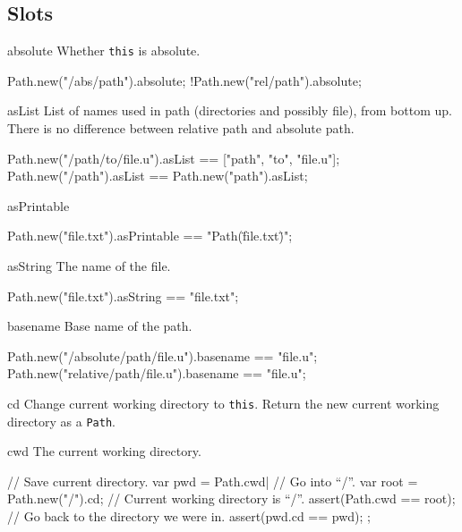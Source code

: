 \subsection{Slots}
\begin{urbiscriptapi}
\item[absolute]
  Whether \lstinline|this| is absolute.
\begin{urbiassert}
Path.new("/abs/path").absolute;
!Path.new("rel/path").absolute;
\end{urbiassert}

\item[asList]
  List of names used in path (directories and possibly file), from
  bottom up. There is no difference between relative path and absolute
  path.
\begin{urbiassert}
Path.new("/path/to/file.u").asList == ["path", "to", "file.u"];
Path.new("/path").asList           == Path.new("path").asList;
\end{urbiassert}

\item[asPrintable]
\begin{urbiassert}
Path.new("file.txt").asPrintable == "Path(\"file.txt\")";
\end{urbiassert}

\item[asString]
  The name of the file.
\begin{urbiassert}
Path.new("file.txt").asString == "file.txt";
\end{urbiassert}

\item[basename]
  Base name of the path.
\begin{urbiassert}
Path.new("/absolute/path/file.u").basename == "file.u";
Path.new("relative/path/file.u").basename  == "file.u";
\end{urbiassert}

\item[cd]
  Change current working directory to \lstinline|this|. Return the new
  current working directory as a \lstinline|Path|.

\item[cwd]
  The current working directory.
\begin{urbiscript}
{
  // Save current directory.
  var pwd = Path.cwd|
  // Go into ``/''.
  var root = Path.new("/").cd;
  // Current working directory is ``/''.
  assert(Path.cwd == root);
  // Go back to the directory we were in.
  assert(pwd.cd == pwd);
};
\end{urbiscript}


\end{urbiscriptapi}
